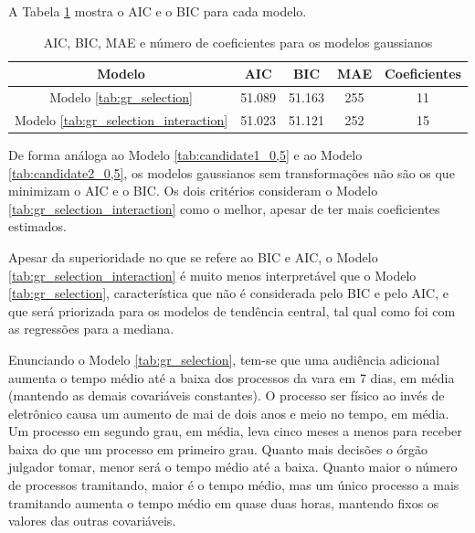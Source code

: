 A Tabela \ref{tab:aic_bic_gaussianos} mostra o AIC e o BIC para cada modelo.

\begin{table}[H]
\centering
\caption{AIC, BIC, MAE e número de coeficientes para os modelos gaussianos} 
\label{tab:aic_bic_gaussianos}
\begin{tabular}{c|cccc}
  \hline
\textbf{Modelo} & \textbf{AIC} & \textbf{BIC} & \textbf{MAE} & \textbf{Coeficientes} \\ 
  \hline
Modelo \ref{tab:gr_selection} & 51.089 & 51.163 & 255 &  11 \\ 
  Modelo \ref{tab:gr_selection_interaction} & 51.023 & 51.121 & 252 &  15 \\  
   \hline
\end{tabular}
\end{table}

De forma análoga ao Modelo \ref{tab:candidate1_0,5} e ao Modelo \ref{tab:candidate2_0,5}, os modelos gaussianos sem transformações não são os que minimizam o AIC e o BIC. Os dois critérios consideram o Modelo \ref{tab:gr_selection_interaction} como o melhor, apesar de ter mais coeficientes estimados.

Apesar da superioridade no que se refere ao BIC e AIC, o Modelo \ref{tab:gr_selection_interaction} é muito menos interpretável que o Modelo \ref{tab:gr_selection}, característica que não é considerada pelo BIC e pelo AIC, e que será priorizada para os modelos de tendência central, tal qual como foi com as regressões para a mediana.

Enunciando o Modelo \ref{tab:gr_selection}, tem-se que uma audiência adicional aumenta o tempo médio até a baixa dos processos da vara em 7 dias, em média (mantendo as demais covariáveis constantes). O processo ser físico ao invés de eletrônico causa um aumento de mai de dois anos e meio no tempo, em média. Um processo em segundo grau, em média, leva cinco meses a menos para receber baixa do que um processo em primeiro grau. Quanto mais decisões o órgão julgador tomar, menor será o tempo médio até a baixa. Quanto maior o número de processos tramitando, maior é o tempo médio, mas um único processo a mais tramitando aumenta o tempo médio em quase duas horas, mantendo fixos os valores das outras covariáveis.


